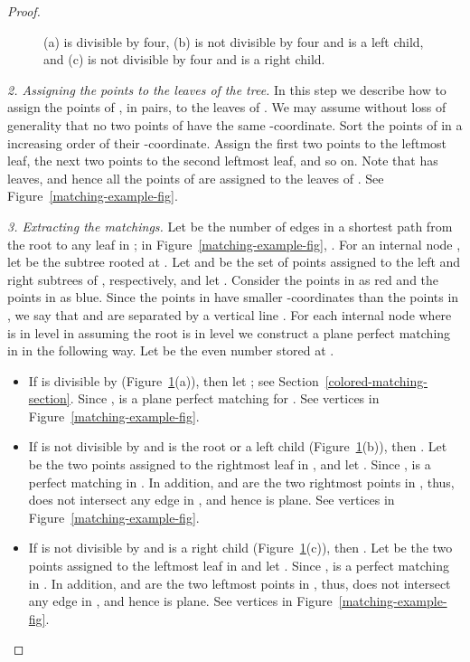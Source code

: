 \documentclass[11pt,a4paper]{article}
\begin{document}
\begin{proof}
\begin{figure}[htb]
  \caption{(a)  is divisible by four, (b)  is not divisible by four and  is a left child, and (c)  is not divisible by four and  is a right child.}
\label{tree-construction-fig}
\end{figure}

\begin{paragraph}{\em \small 2. Assigning the points to the leaves of the tree.}
In this step we describe how to assign the points of , in pairs, to the leaves of . We may assume without loss of generality that no two points of  have the same -coordinate. Sort the points of  in a increasing order of their -coordinate.
Assign the first two points to the leftmost leaf, the next two points to the second leftmost leaf, and so on. Note that  has  leaves, and hence all the points of  are assigned to the leaves of . See Figure~\ref{matching-example-fig}.  
\end{paragraph}

\begin{paragraph}{\em \small 3. Extracting the matchings.}
Let  be the number of edges in a shortest path from the root to any leaf in ; in Figure~\ref{matching-example-fig}, . For an internal node , let  be the subtree rooted at . Let  and  be the set of points assigned to the left and right subtrees of , respectively, and let . Consider the points in  as red and the points in  as blue. Since the points in  have smaller -coordinates than the points in , we say that  and  are separated by a vertical line . For each internal node  where  is in level  in \textemdash assuming the root is in level \textemdash we construct a plane perfect matching  in  in the following way. Let  be the even number stored at .
\begin{itemize}
  \item If  is divisible by  (Figure~\ref{tree-construction-fig}(a)), then let ; see Section~\ref{colored-matching-section}. Since ,  is a plane perfect matching for . See vertices  in Figure~\ref{matching-example-fig}.

  \item If  is not divisible by  and  is the root or a left child (Figure~\ref{tree-construction-fig}(b)), then . Let  be the two points assigned to the rightmost leaf in , and let . Since ,  is a perfect matching in . In addition,  and  are the two rightmost points in , thus,  does not intersect any edge in , and hence  is plane. See vertices  in Figure~\ref{matching-example-fig}.

  \item If  is not divisible by  and  is a right child (Figure~\ref{tree-construction-fig}(c)), then . Let  be the two points assigned to the leftmost leaf in  and let . Since ,  is a perfect matching in . In addition,  and  are the two leftmost points in , thus,  does not intersect any edge in , and hence  is plane. See vertices  in Figure~\ref{matching-example-fig}.
\end{itemize}


\end{paragraph}
\end{proof}
\end{document}
